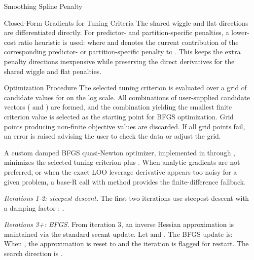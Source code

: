 \begin{Section}{Smoothing Spline Penalty}
\begin{SubSection}{Closed-Form Gradients for Tuning Criteria}
The shared wiggle and flat directions are differentiated directly. For
predictor- and partition-specific penalties, a lower-cost ratio heuristic is
used:
where  and
 denotes the current contribution of the corresponding
predictor- or partition-specific penalty to \eqn{\boldsymbol{\Lambda}}{}. This
keeps the extra penalty directions inexpensive while preserving the direct
derivatives for the shared wiggle and flat penalties.
\end{SubSection}


%
\begin{SubSection}{Optimization Procedure}
 The selected tuning criterion is
evaluated over a grid of candidate values for
 on the log scale. All combinations of
user-supplied candidate vectors ( and
) are formed, and the combination yielding
the smallest finite criterion value is selected as the starting
point for BFGS optimization. Grid points producing non-finite
objective values are discarded. If all grid points fail, an error
is raised advising the user to check the data or adjust the grid.

 A custom damped BFGS quasi-Newton optimizer,
implemented in  through
, minimizes the selected tuning criterion plus
. When analytic gradients are not preferred, or when
the exact LOO leverage derivative appears too noisy for a given problem, a
base-R  call with method  provides
the finite-difference fallback.

\emph{Iterations 1-2: steepest descent.} The first two iterations use
steepest descent with a damping factor \eqn{\alpha}{}:
.

\emph{Iterations 3+: BFGS.} From iteration 3, an inverse Hessian
approximation  is maintained via the standard secant
update. Let
and
. The BFGS update
is:
When , the approximation is
reset to  and the iteration is flagged for restart. The
search direction is
.


\end{SubSection}
\end{Section}
